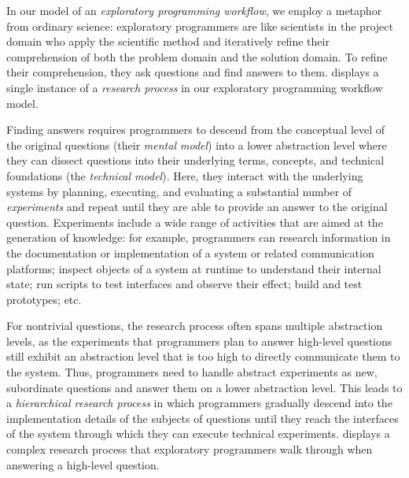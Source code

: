 In our model of an \emph{exploratory programming workflow}, we employ a metaphor from ordinary science:
exploratory programmers are like scientists in the project domain who apply the scientific method and iteratively refine their comprehension of both the problem domain and the solution domain.
To refine their comprehension, they ask questions and find answers to them.
 displays a single instance of a \emph{research process} in our exploratory programming workflow model.

Finding answers requires programmers to descend from the conceptual level of the original questions (their \emph{mental model}) into a lower abstraction level where they can dissect questions into their underlying terms, concepts, and technical foundations (the \emph{technical model}).
Here, they interact with the underlying systems by planning, executing, and evaluating a substantial number of \emph{experiments} and repeat until they are able to provide an answer to the original question.
Experiments include a wide range of activities that are aimed at the generation of knowledge:
for example, programmers can research information in the documentation or implementation of a system or related communication platforms; inspect objects of a system at runtime to understand their internal state; run scripts to test interfaces and observe their effect; build and test prototypes; etc.

For nontrivial questions, the research process often spans multiple abstraction levels, as the experiments that programmers plan to answer high-level questions still exhibit an abstraction level that is too high to directly communicate them to the system.
Thus, programmers need to handle abstract experiments as new, subordinate questions and answer them on a lower abstraction level.
This leads to a \emph{hierarchical research process} in which programmers gradually descend into the implementation details of the subjects of questions until they reach the interfaces of the system through which they can execute technical experiments.
 displays a complex research process that exploratory programmers walk through when answering a high-level question.

